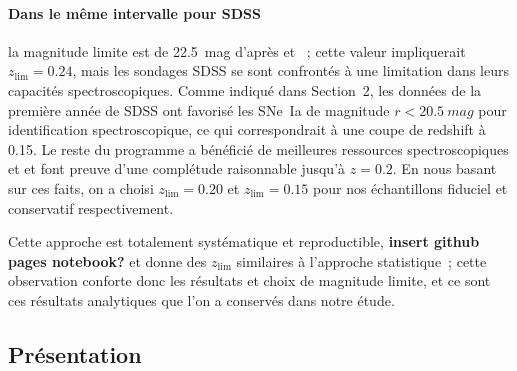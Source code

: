 \documentclass[../main/main.tex]{subfiles}
\begin{document}
\paragraph*{Dans le même intervalle pour SDSS} la magnitude limite est de
\SI{22.5}{mag} d'après \cite{dilday2008} et \cite{sako2008}~; cette valeur 
impliquerait $z_{\lim}=0.24$, mais les sondages SDSS se sont confrontés à une
limitation dans leurs capacités spectroscopiques. Comme indiqué dans
\cite{kessler2009a} Section~2, les données de la première année de SDSS ont
favorisé les SNe~Ia de magnitude $r < \SI{20.5}{mag}$ pour identification
spectroscopique, ce qui correspondrait à une coupe de redshift à 0.15. Le reste
du programme a bénéficié de meilleures ressources spectroscopiques et
\cite{kessler2009a} et \cite{dilday2008} font preuve d'une complétude
raisonnable jusqu'à $z=0.2$. En nous basant sur ces faits, on a choisi
$z_{\lim}=0.20$ et $z_{\lim}=0.15$ pour nos échantillons fiduciel et
conservatif respectivement.

Cette approche est totalement systématique et reproductible, \textbf{insert
github pages notebook?} et donne des $z_{\lim}$ similaires à l'approche
statistique~; cette observation conforte donc les résultats et choix de
magnitude limite, et ce sont ces résultats analytiques que l'on a conservés dans
notre étude.

\subsection{Présentation}\label{ssec:dataset}
\end{document}
